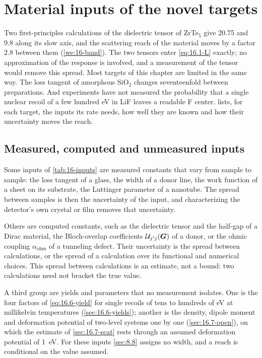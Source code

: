 \section{Material inputs of the novel targets}\label{sec:16.9}

Two first-principles calculations of the dielectric tensor of ZrTe$_5$ give 20.75 and 9.8 along its slow axis, and the scattering reach of the material moves by a factor 2.8 between them (\cref{we:16-band}). The two tensors enter \cref{eq:16.1-L} exactly; no approximation of the response is involved, and a measurement of the tensor would remove this spread. Most targets of this chapter are limited in the same way. The loss tangent of amorphous SiO$_2$ changes seventeenfold between preparations. And experiments have not measured the probability that a single nuclear recoil of a few hundred eV in LiF leaves a readable F center.  lists, for each target, the inputs its rate needs, how well they are known and how their uncertainty moves the reach.

\subsection{Measured, computed and unmeasured inputs}\label{sec:16.9-inputs}

Some inputs of \cref{tab:16-inputs} are measured constants that vary from sample to sample: the loss tangent of a glass, the width of a donor line, the work function of a sheet on its substrate, the Luttinger parameter of a nanotube. The spread between samples is then the uncertainty of the input, and characterizing the detector's own crystal or film removes that uncertainty.

Others are computed constants, such as the dielectric tensor and the half-gap of a Dirac material, the Bloch-overlap coefficients $\mathcal{U}_{j'j}(\bm{G})$ of a donor, or the ohmic coupling $\alpha_{\mathrm{ohm}}$ of a tunneling defect. Their uncertainty is the spread between calculations, or the spread of a calculation over its functional and numerical choices. This spread between calculations is an estimate, not a bound: two calculations need not bracket the true value.

A third group are yields and parameters that no measurement isolates. One is the four factors of \cref{eq:16.6-yield} for single recoils of tens to hundreds of eV at millikelvin temperatures (\cref{sec:16.6-yields}); another is the density, dipole moment and deformation potential of two-level systems one by one (\cref{sec:16.7-open}), on which the estimate of \cref{sec:16.7-scat} rests through an assumed deformation potential of \SI{1}{eV}. For these inputs \cref{sec:8.8} assigns no width, and a reach is conditional on the value assumed.

